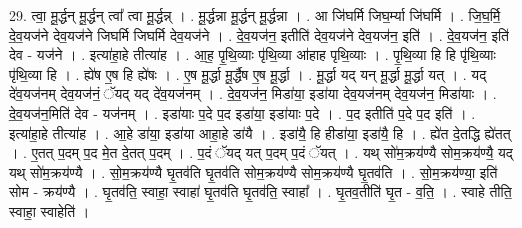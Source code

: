 \documentclass[17pt]{extarticle}
\begin{document}
29. त्वा॒ मू॒र्द्धन् मू॒र्द्धन् त्वा᳚ त्वा मू॒र्द्धन्न् । . मू॒र्द्धन्ना मू॒र्द्धन् मू॒र्द्धन्ना । . आ जि॑घर्मि जिघ॒र्म्या जि॑घर्मि । . जि॒घ॒र्मि॒ दे॒व॒यज॑ने देव॒यज॑ने जिघर्मि जिघर्मि देव॒यज॑ने । . दे॒व॒यज॑न॒ इतीति॑ देव॒यज॑ने देव॒यज॑न॒ इति॑ । . दे॒व॒यज॑न॒ इति॑ देव - यज॑ने । . इत्या॑हा॒हे तीत्या॑ह । . आ॒ह॒ पृ॒थि॒व्याः पृ॑थि॒व्या आ॑हाह पृथि॒व्याः । . पृ॒थि॒व्या हि हि पृ॑थि॒व्याः पृ॑थि॒व्या हि । . ह्ये॑ष ए॒ष हि ह्ये॑षः । . ए॒ष मू॒र्द्धा मू॒र्द्धैष ए॒ष मू॒र्द्धा । . मू॒र्द्धा यद् यन् मू॒र्द्धा मू॒र्द्धा यत् । . यद् दे॑व॒यज॑नम् देव॒यज॑नं॒ ॅयद् यद् दे॑व॒यज॑नम् । . दे॒व॒यज॑न॒ मिडा॑या॒ इडा॑या देव॒यज॑नम् देव॒यज॑न॒ मिडा॑याः । . दे॒व॒यज॑न॒मिति॑ देव - यज॑नम् । . इडा॑याः प॒दे प॒द इडा॑या॒ इडा॑याः प॒दे । . प॒द इतीति॑ प॒दे प॒द इति॑ । . इत्या॑हा॒हे तीत्या॑ह । . आ॒हे डा॑या॒ इडा॑या आहा॒हे डा॑यै । . इडा॑यै॒ हि हीडा॑या॒ इडा॑यै॒ हि । . ह्ये॑त दे॒तद्धि ह्ये॑तत् । . ए॒तत् प॒दम् प॒द मे॒त दे॒तत् प॒दम् । . प॒दं ॅयद् यत् प॒दम् प॒दं ॅयत् । . यथ् सो॑म॒क्रय॑ण्यै सोम॒क्रय॑ण्यै॒ यद् यथ् सो॑म॒क्रय॑ण्यै । . सो॒म॒क्रय॑ण्यै घृ॒तव॑ति घृ॒तव॑ति सोम॒क्रय॑ण्यै सोम॒क्रय॑ण्यै घृ॒तव॑ति । . सो॒म॒क्रय॑ण्या॒ इति॑ सोम - क्रय॑ण्यै । . घृ॒तव॑ति॒ स्वाहा॒ स्वाहा॑ घृ॒तव॑ति घृ॒तव॑ति॒ स्वाहा᳚ । . घृ॒तव॒तीति॑ घृ॒त - व॒ति॒ । . स्वाहे तीति॒ स्वाहा॒ स्वाहेति॑ । \newline
\end{document}
